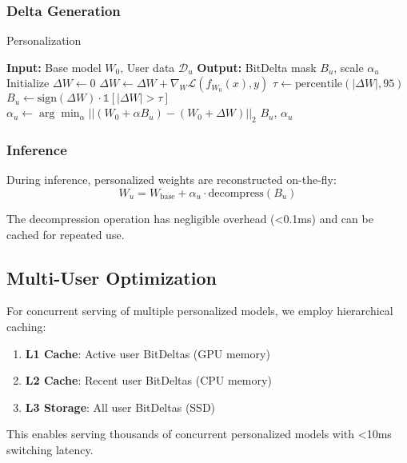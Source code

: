 \subsubsection{Delta Generation}
\begin{algorithm}
\caption{\bitdelta{} Personalization}
\begin{algorithmic}[1]
\STATE \textbf{Input:} Base model $W_0$, User data $\mathcal{D}_u$
\STATE \textbf{Output:} BitDelta mask $B_u$, scale $\alpha_u$
\STATE Initialize $\Delta W \leftarrow 0$
    \STATE $\Delta W \leftarrow \Delta W + \nabla_W \mathcal{L}(f_{W_0}(x), y)$
\ENDFOR
\STATE $\tau \leftarrow \text{percentile}(|\Delta W|, 95)$
\STATE $B_u \leftarrow \text{sign}(\Delta W) \cdot \mathbb{1}[|\Delta W| > \tau]$
\STATE $\alpha_u \leftarrow \arg\min_\alpha ||(W_0 + \alpha B_u) - (W_0 + \Delta W)||_2$
\RETURN $B_u$, $\alpha_u$
\end{algorithmic}
\end{algorithm}

\subsubsection{Inference}
During inference, personalized weights are reconstructed on-the-fly:
\begin{equation}
W_u = W_{\text{base}} + \alpha_u \cdot \text{decompress}(B_u)
\end{equation}

The decompression operation has negligible overhead (<0.1ms) and can be cached for repeated use.

\subsection{Multi-User Optimization}

For concurrent serving of multiple personalized models, we employ hierarchical caching:

\begin{enumerate}
    \item \textbf{L1 Cache}: Active user BitDeltas (GPU memory)
    \item \textbf{L2 Cache}: Recent user BitDeltas (CPU memory)
    \item \textbf{L3 Storage}: All user BitDeltas (SSD)
\end{enumerate}

This enables serving thousands of concurrent personalized models with <10ms switching latency.

